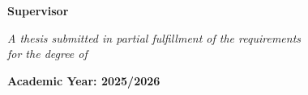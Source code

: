 \documentclass[11pt, a4paper, twoside, openright]{book}
\begin{document}
\begin{titlepage}
    {\large\textcolor{asuBlue}{\textbf{Supervisor}}\par}
    \vspace{0.3cm}
    {\large \supname\par}

    \vfill   %

    \textit{A thesis submitted in partial fulfillment of the requirements\\
        for the degree of \degreename}

    \vspace{1cm}

    {\large\textbf{Academic Year: 2025/2026}}

\end{titlepage}

\hypersetup{pageanchor=true}
\frontmatter                  %
\pagestyle{plain}
\end{document}
